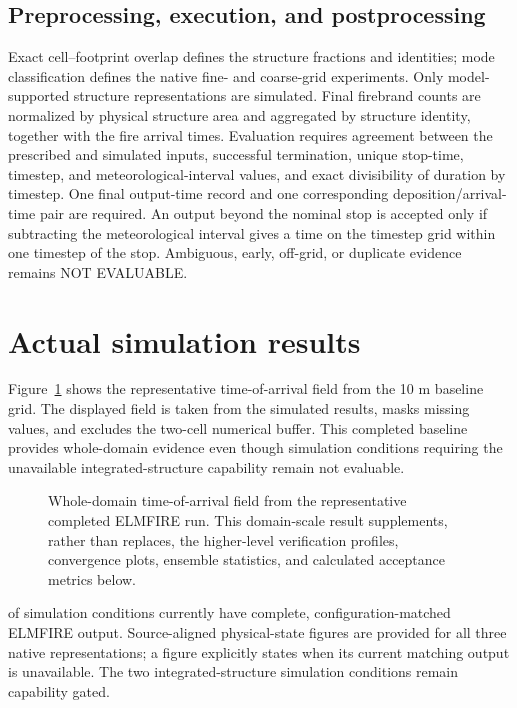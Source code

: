\subsection{Preprocessing, execution, and postprocessing}

Exact cell--footprint overlap defines the structure fractions and identities;
mode classification defines the native fine- and coarse-grid experiments.
Only model-supported structure representations are simulated. Final firebrand
counts are normalized by physical structure area and aggregated by structure
identity, together with the fire arrival times. Evaluation requires agreement
between the prescribed and simulated inputs, successful termination, unique
stop-time, timestep, and meteorological-interval values, and exact divisibility
of duration by timestep. One final output-time record and one corresponding
deposition/arrival-time pair are required. An output beyond the nominal stop
is accepted only if subtracting the meteorological interval gives a time on
the timestep grid within one timestep of the stop. Ambiguous, early, off-grid,
or duplicate evidence remains NOT EVALUABLE.

\clearpage
\section{Actual simulation results}

Figure~\ref{fig:domain-result} shows the representative time-of-arrival field from the 10 m baseline grid.
The displayed field is taken from the simulated results, masks missing values, and excludes
the two-cell numerical buffer.  This completed baseline provides whole-domain evidence even though simulation conditions requiring the unavailable integrated-structure capability remain not evaluable.

\begin{figure}[H]
\centering
{}
\caption{Whole-domain time-of-arrival field from the representative completed ELMFIRE run.  This
domain-scale result supplements, rather than replaces, the higher-level verification
profiles, convergence plots, ensemble statistics, and calculated acceptance metrics below.}
\label{fig:domain-result}
\end{figure}

\CompletedVariantCount{} of \RequestedVariantCount{} simulation conditions currently have
complete, configuration-matched ELMFIRE output. Source-aligned physical-state
figures are provided for all three native representations; a figure explicitly
states when its current matching output is unavailable. The two
integrated-structure simulation conditions remain capability gated.

